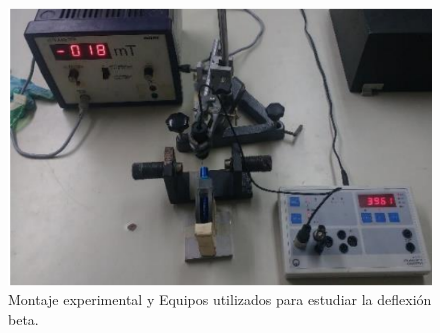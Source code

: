 
\begin{figure}[h!]
    \centering
    \includegraphics[scale=0.5]{Montaje_Exp.png}
    \caption{Montaje experimental y Equipos utilizados para estudiar la deflexión beta.}
    \label{fig:1}
\end{figure} \\

